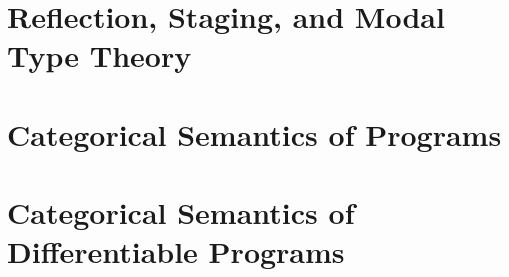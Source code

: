 \documentclass[11pt]{report}
\theoremstyle{definition}
\begin{document}
\begin{mainf}

\section{Reflection, Staging, and Modal Type Theory}
\label{sec:foundations-staging}


\section{Categorical Semantics of Programs}
\label{sec:foundations-cat-programs}


\section{Categorical Semantics of Differentiable Programs}
\label{sec:foundations-cat-dl}



\end{mainf}
\end{document}
